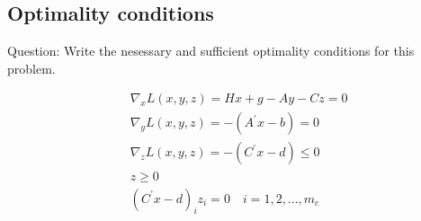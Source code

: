 \subsection{\bfseries Optimality conditions}
\begin{shaded}
{Question: Write the nesessary and sufficient optimality conditions for this problem.}
\end{shaded}
\begin{align*}
& \nabla_{x} L\left(x,y,z\right)=Hx+g-Ay-Cz=0\tag{2.3}\\
& \nabla_{y} L\left(x,y,z\right)=-\left(A^{\prime}x-b\right)=0\tag{2.4}\\
& \nabla_{z} L\left(x,y,z\right)=-\left(C^{\prime}x-d\right) \le 0\tag{2.5}\\
& z \ge 0 \tag{2.6}\\
& \left(C^{\prime}x-d\right)_iz_i=0 \quad i=1,2,...,m_c \tag{2.7}
\end{align*}
